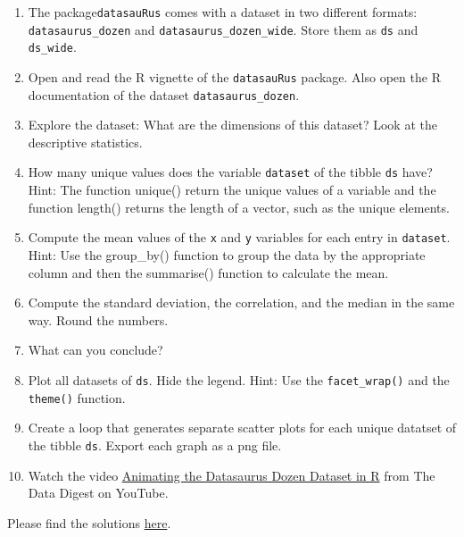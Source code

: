 \documentclass[
  12pt,
  oneside]{book}
\theoremstyle{definition}
\theoremstyle{definition}
\theoremstyle{definition}
\theoremstyle{definition}
\theoremstyle{remark}
\begin{document}
\begin{enumerate}
\def\labelenumi{\alph{enumi})}
\setcounter{enumi}{1}
\item
  The package\texttt{datasauRus} comes with a dataset in two different formats: \texttt{datasaurus\_dozen} and \texttt{datasaurus\_dozen\_wide}. Store them as \texttt{ds} and \texttt{ds\_wide}.
\item
  Open and read the R vignette of the \texttt{datasauRus} package. Also open the R documentation of the dataset \texttt{datasaurus\_dozen}.
\item
  Explore the dataset: What are the dimensions of this dataset? Look at the descriptive statistics.
\item
  How many unique values does the variable \texttt{dataset} of the tibble \texttt{ds} have? Hint: The function unique() return the unique values of a variable and the function length() returns the length of a vector, such as the unique elements.
\item
  Compute the mean values of the \texttt{x} and \texttt{y} variables for each entry in \texttt{dataset}. Hint: Use the group\_by() function to group the data by the appropriate column and then the summarise() function to calculate the mean.
\item
  Compute the standard deviation, the correlation, and the median in the same way. Round the numbers.
\item
  What can you conclude?
\item
  Plot all datasets of \texttt{ds}. Hide the legend. Hint: Use the \texttt{facet\_wrap()} and the \texttt{theme()} function.
\item
  Create a loop that generates separate scatter plots for each unique datatset of the tibble \texttt{ds}. Export each graph as a png file.
\item
  Watch the video \href{https://youtu.be/T-kxUB29t0o}{Animating the Datasaurus Dozen Dataset in R} from The Data Digest on YouTube.
\end{enumerate}

Please find the solutions \href{https://htmlpreview.github.io/?https://raw.githubusercontent.com/hubchev/hubchev.github.io/main/various/datasaurus_solution.html}{here}.
\end{document}
